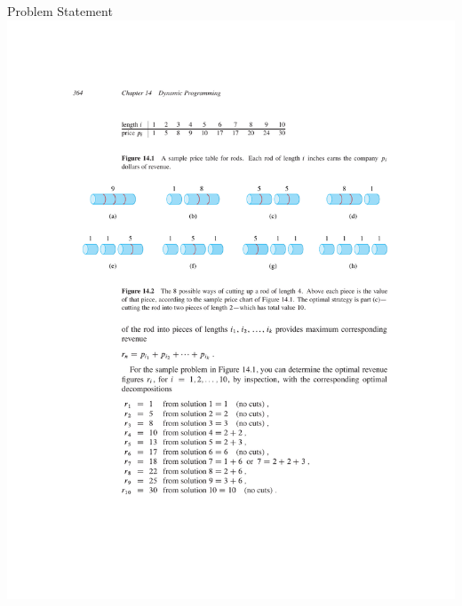 \documentclass{beamer}
\begin{document}
\begin{frame}{Problem Statement}
    \centering
    \includegraphics[width=\textwidth,clip=true,trim=3cm 13.5cm 3cm 8cm]{figures/p364}
\end{frame}
\end{document}
